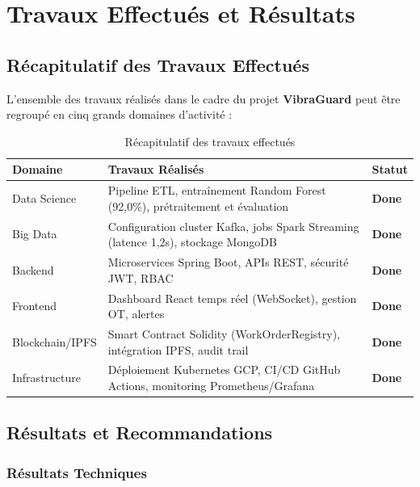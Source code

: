 \documentclass[12pt, a4paper, oneside]{report}
\newcommand{\projectname}{\textbf{VibraGuard}}
\begin{document}
\chapter{Travaux Effectués et Résultats}

\section{Récapitulatif des Travaux Effectués}

L'ensemble des travaux réalisés dans le cadre du projet \projectname{} peut être regroupé
en cinq grands domaines d'activité :

\begin{table}[H]
  \centering
  \small
  \begin{tabularx}{\textwidth}{L{3cm} L{8cm} C{1.5cm}}
    \toprule
    \textbf{Domaine} &
    \textbf{Travaux Réalisés} &
    \textbf{Statut} \\
    \midrule
           Data Science    & Pipeline ETL, entraînement Random Forest (92,0\%), prétraitement et évaluation & \textbf{Done} \\
    Big Data        & Configuration cluster Kafka, jobs Spark Streaming (latence 1,2s), stockage MongoDB & \textbf{Done} \\
           Backend         & Microservices Spring Boot, APIs REST, sécurité JWT, RBAC & \textbf{Done} \\
    Frontend        & Dashboard React temps réel (WebSocket), gestion OT, alertes & \textbf{Done} \\
           Blockchain/IPFS & Smart Contract Solidity (WorkOrderRegistry), intégration IPFS, audit trail & \textbf{Done} \\
    Infrastructure  & Déploiement Kubernetes GCP, CI/CD GitHub Actions, monitoring Prometheus/Grafana & \textbf{Done} \\
    \bottomrule
  \end{tabularx}
  \caption{Récapitulatif des travaux effectués}
\end{table}

\section{Résultats et Recommandations}

\subsection{Résultats Techniques}
\end{document}
